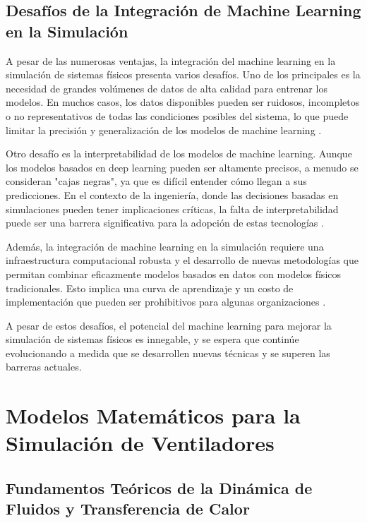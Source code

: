 \subsection{Desafíos de la Integración de Machine Learning en la Simulación}

A pesar de las numerosas ventajas, la integración del machine learning en la simulación de sistemas físicos presenta varios desafíos. Uno de los principales es la necesidad de grandes volúmenes de datos de alta calidad para entrenar los modelos. En muchos casos, los datos disponibles pueden ser ruidosos, incompletos o no representativos de todas las condiciones posibles del sistema, lo que puede limitar la precisión y generalización de los modelos de machine learning \cite{yang2020data}.

Otro desafío es la interpretabilidad de los modelos de machine learning. Aunque los modelos basados en deep learning pueden ser altamente precisos, a menudo se consideran "cajas negras", ya que es difícil entender cómo llegan a sus predicciones. En el contexto de la ingeniería, donde las decisiones basadas en simulaciones pueden tener implicaciones críticas, la falta de interpretabilidad puede ser una barrera significativa para la adopción de estas tecnologías \cite{rudin2019stop}.

Además, la integración de machine learning en la simulación requiere una infraestructura computacional robusta y el desarrollo de nuevas metodologías que permitan combinar eficazmente modelos basados en datos con modelos físicos tradicionales. Esto implica una curva de aprendizaje y un costo de implementación que pueden ser prohibitivos para algunas organizaciones \cite{karniadakis2021physics}.

A pesar de estos desafíos, el potencial del machine learning para mejorar la simulación de sistemas físicos es innegable, y se espera que continúe evolucionando a medida que se desarrollen nuevas técnicas y se superen las barreras actuales.


\section{Modelos Matemáticos para la Simulación de Ventiladores}

\subsection{Fundamentos Teóricos de la Dinámica de Fluidos y Transferencia de Calor}

